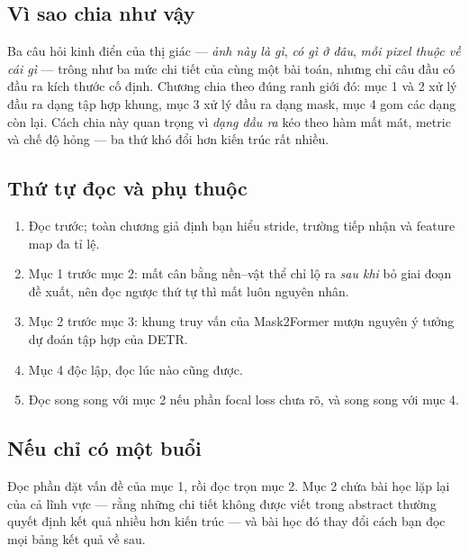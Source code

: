\documentclass[../../deep_learning.tex]{subfiles}
\begin{document}
\subsection*{Vì sao chia như vậy}
Ba câu hỏi kinh điển của thị giác --- \emph{ảnh này là gì}, \emph{có gì ở đâu}, \emph{mỗi pixel thuộc về cái gì} --- trông như ba mức chi tiết của cùng một bài toán, nhưng chỉ câu đầu có đầu ra kích thước cố định. Chương chia theo đúng ranh giới đó: mục 1 và 2 xử lý đầu ra dạng tập hợp khung, mục 3 xử lý đầu ra dạng mask, mục 4 gom các dạng còn lại. Cách chia này quan trọng vì \emph{dạng đầu ra} kéo theo hàm mất mát, metric và chế độ hỏng --- ba thứ khó đổi hơn kiến trúc rất nhiều.

\subsection*{Thứ tự đọc và phụ thuộc}
\begin{enumerate}
\item Đọc  trước; toàn chương giả định bạn hiểu stride, trường tiếp nhận và feature map đa tỉ lệ.
\item Mục 1 trước mục 2: mất cân bằng nền--vật thể chỉ lộ ra \emph{sau khi} bỏ giai đoạn đề xuất, nên đọc ngược thứ tự thì mất luôn nguyên nhân.
\item Mục 2 trước mục 3: khung truy vấn của Mask2Former mượn nguyên ý tưởng dự đoán tập hợp của DETR.
\item Mục 4 độc lập, đọc lúc nào cũng được.
\item Đọc  song song với mục 2 nếu phần focal loss chưa rõ, và  song song với mục 4.
\end{enumerate}

\subsection*{Nếu chỉ có một buổi}
Đọc phần đặt vấn đề của mục 1, rồi đọc trọn mục 2. Mục 2 chứa bài học lặp lại của cả lĩnh vực --- rằng những chi tiết không được viết trong abstract thường quyết định kết quả nhiều hơn kiến trúc --- và bài học đó thay đổi cách bạn đọc mọi bảng kết quả về sau.
\end{document}
